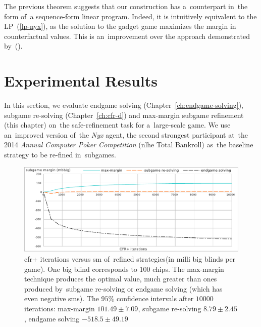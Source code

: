 The previous theorem suggests that our construction has a~counterpart in~the form of~a sequence-form linear program.
Indeed, it is intuitively equivalent to the LP~(\ref{lp-nyx}), as the solution to the gadget game maximizes the margin in counterfactual values.
This is an~improvement over the approach demonstrated by~(\cite{BurchJohansonBowling2014}).

\section{Experimental Results}
\label{sec:max-margin-experiments}
In this section, we evaluate endgame solving (Chapter~\ref{ch:endgame-solving}), subgame re-solving (Chapter~\ref{ch:cfr-d}) and max-margin subgame refinement (this chapter) on~the safe-refinement task for a~large-scale game.
We use an~improved version of~the \emph{Nyx} agent, the second strongest participant at~the 2014 \emph{Annual Computer Poker Competition} (\acrlong{nlhe} Total Bankroll)\footnotemark{} as~the baseline strategy to be re-fined in~subgames.

\begin{figure}[H]
  \centering
  \includegraphics[width=\textwidth]{../img/sm-experiments}
  \def\captionTitle{\acrshort{cfr}+ iterations versus \acrshort{sm} of~refined strategies}
  \caption[\captionTitle]{\captionTitle (in milli big blinds per game).
    One big blind corresponds to 100 chips.
    The max-margin technique produces the optimal value, much greater than ones produced by~subgame re-solving or endgame solving (which has even negative \acrshort{sm}s).
    The $95\%$ confidence intervals after $10000$ iterations:
    max-margin $101.49 \pm 7.09$, subgame re-solving $8.79 \pm 2.45$, endgame solving $-518.5 \pm 49.19$
  }
  \label{fig:sm-experiments}
\end{figure}

